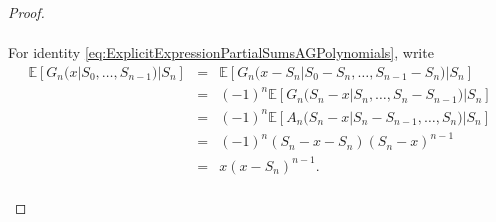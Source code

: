 \begin{proof}
\begin{enumerate}
\begin{eqnarray*}
\end{eqnarray*}
For identity \eqref{eq:ExplicitExpressionPartialSumsAGPolynomials}, write 
\begin{eqnarray*}
\mathbb{E}\left[G_{n}(x|S_0,\ldots, S_{n-1})|S_{n}\right]&=&\mathbb{E}\left[G_{n}(x-S_n|S_0 - S_n,\ldots, S_{n-1}-S_n)|S_{n}\right]\\
&=&(-1)^n\mathbb{E}\left[G_{n}(S_n-x|S_n,\ldots, S_{n}-S_{n-1})|S_{n}\right]\\
&=&(-1)^n\mathbb{E}\left[A_{n}(S_n-x|S_{n}-S_{n-1},\ldots, S_n)|S_{n}\right]\\
&=&(-1)^n(S_n-x -S_n)(S_n-x)^{n-1}\\
&=&x(x-S_n)^{n-1}.\\
\end{eqnarray*}
\end{enumerate}
\end{proof}

